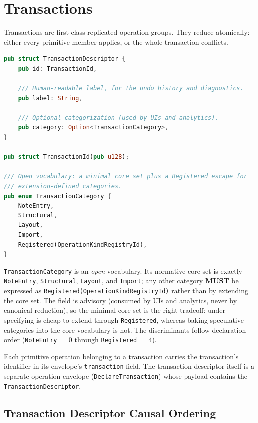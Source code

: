 \documentclass[11pt,letterpaper]{report}
\newcounter{requirement}[chapter]
\newcommand{\MUST}{\textbf{MUST}}
\begin{document}
\section{Transactions}
\label{sec:semops:transactions}

Transactions are first-class replicated operation groups. They reduce
atomically: either every primitive member applies, or the whole
transaction conflicts.

\begin{lstlisting}[language=Rust]
pub struct TransactionDescriptor {
    pub id: TransactionId,

    /// Human-readable label, for the undo history and diagnostics.
    pub label: String,

    /// Optional categorization (used by UIs and analytics).
    pub category: Option<TransactionCategory>,
}

pub struct TransactionId(pub u128);

/// Open vocabulary: a minimal core set plus a Registered escape for
/// extension-defined categories.
pub enum TransactionCategory {
    NoteEntry,
    Structural,
    Layout,
    Import,
    Registered(OperationKindRegistryId),
}
\end{lstlisting}

\begin{requirement}
  \label{req:semops:transaction-category}
  \texttt{TransactionCategory} is an \emph{open} vocabulary. Its
  normative core set is exactly \texttt{NoteEntry}, \texttt{Structural},
  \texttt{Layout}, and \texttt{Import}; any other category \MUST{} be
  expressed as \texttt{Registered(OperationKindRegistryId)} rather than
  by extending the core set. The field is advisory (consumed by UIs and
  analytics, never by canonical reduction), so the minimal core set is
  the right tradeoff: under-specifying is cheap to extend through
  \texttt{Registered}, whereas baking speculative categories into the
  core vocabulary is not. The discriminants follow declaration order
  (\texttt{NoteEntry} $= 0$ through \texttt{Registered} $= 4$).
\end{requirement}

Each primitive operation belonging to a transaction carries the
transaction's identifier in its envelope's \texttt{transaction} field.
The transaction descriptor itself is a separate operation envelope
(\texttt{DeclareTransaction}) whose payload contains the
\texttt{TransactionDescriptor}.

\subsection{Transaction Descriptor Causal Ordering}
\label{sec:semops:transaction-causal}
\end{document}
